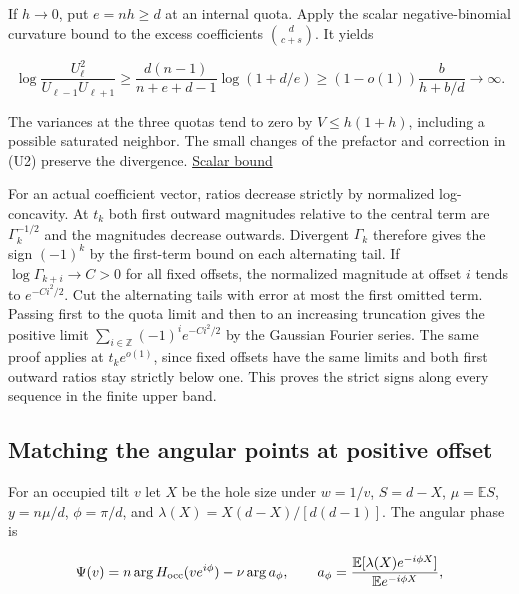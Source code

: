 If $h\to0$, put $e=nh\ge d$ at an internal quota. Apply the scalar negative-binomial curvature bound to the excess coefficients $\binom d{c+s}$. It yields

\begin{equation*}
\log\frac{U_\ell^2}{U_{\ell-1}U_{\ell+1}}
\ge \frac{d(n-1)}{n+e+d-1}\log(1+d/e)
\ge (1-o(1))\frac{b}{h+b/d}\longrightarrow\infty.
\end{equation*}

The variances at the three quotas tend to zero by $V\le h(1+h)$, including a possible saturated neighbor. The small changes of the prefactor and correction in (U2) preserve the divergence. \href{https://github.com/ProgramComputer/open-math-research/blob/04564a728c21eab6ce511b98a48ccaac754648ff/topics/balanced-arrays/very-tall/very-tall-upper-quota.md#the-last-od-quotas}{Scalar bound}

For an actual coefficient vector, ratios decrease strictly by normalized log-concavity. At $t_k$ both first outward magnitudes relative to the central term are $\Gamma_k^{-1/2}$ and the magnitudes decrease outwards. Divergent $\Gamma_k$ therefore gives the sign $(-1)^k$ by the first-term bound on each alternating tail. If $\log\Gamma_{k+i}\to C>0$ for all fixed offsets, the normalized magnitude at offset $i$ tends to $e^{-Ci^2/2}$. Cut the alternating tails with error at most the first omitted term. Passing first to the quota limit and then to an increasing truncation gives the positive limit $\sum_{i\in\mathbb Z}(-1)^i e^{-Ci^2/2}$ by the Gaussian Fourier series. The same proof applies at $t_ke^{o(1)}$, since fixed offsets have the same limits and both first outward ratios stay strictly below one. This proves the strict signs along every sequence in the finite upper band.

\subsection{Matching the angular points at positive offset}

For an occupied tilt $v$ let $X$ be the hole size under $w=1/v$, $S=d-X$, $\mu=\mathbb ES$, $y=n\mu/d$, $\phi=\pi/d$, and $\lambda(X)=X(d-X)/[d(d-1)]$. The angular phase is

\begin{equation*}
\Psi(v)=n\arg H_{\rm occ}(ve^{i\phi})-\nu\arg a_\phi,\qquad
a_\phi=\frac{\mathbb E[\lambda(X)e^{-i\phi X}]}{\mathbb E e^{-i\phi X}} ,
\end{equation*}

